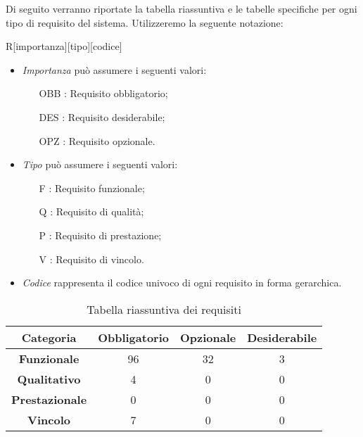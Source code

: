 Di seguito verranno riportate la tabella riassuntiva e le tabelle specifiche per ogni tipo di requisito del sistema. Utilizzeremo la seguente notazione:

R[importanza][tipo][codice]

\begin{itemize}
	\item \textit{Importanza} può assumere i seguenti valori:
	\begin{itemize}
		\item [OBB]: Requisito obbligatorio;
		\item [DES]: Requisito desiderabile;
		\item [OPZ]: Requisito opzionale.
	\end{itemize}
	
	\item \textit{Tipo} può assumere i seguenti valori:
	\begin{itemize}
		\item [F] : Requisito funzionale;
		\item [Q] : Requisito di qualità;
		\item [P] : Requisito di prestazione;
		\item [V] : Requisito di vincolo.
	\end{itemize}
	
	\item \textit{Codice} rappresenta il codice univoco di ogni requisito in forma gerarchica.
\end{itemize}

	\begin{table}[h]
		\centering
		\begin{tabular}{|c|c|c|c|}
			\toprule
			
			\textbf{Categoria} & \textbf{Obbligatorio} & \textbf{Opzionale} & \textbf{Desiderabile} \\
			
			\midrule
			\textbf{Funzionale} & 96 & 32 & 3 \\ \midrule
			\textbf{Qualitativo} & 4 & 0 & 0 \\  \midrule
			\textbf{Prestazionale} & 0 & 0 & 0 \\ \midrule
			\textbf{Vincolo} & 7 & 0 & 0  \\
			
			\bottomrule
			
		\end{tabular}
		\caption{Tabella riassuntiva dei requisiti}
		
	\end{table}
	\newpage


\newpage


\newpage


\newpage


\newpage

%

